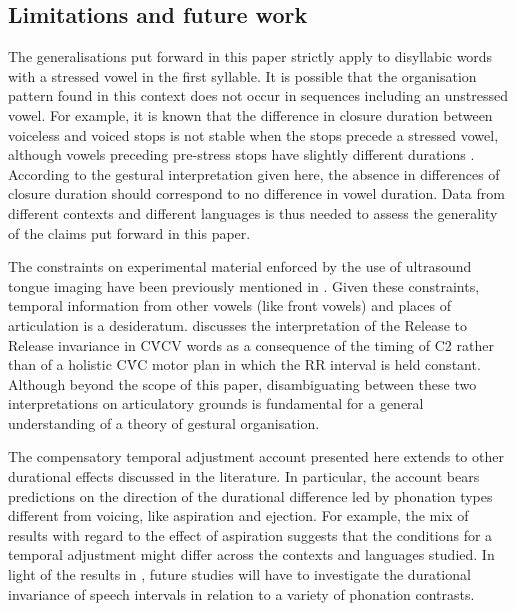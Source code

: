 \documentclass[preprint]{JASAnew}
\begin{document}
\hypertarget{limitations-and-future-work}{%
\subsection{Limitations and future
work}\label{limitations-and-future-work}}

The generalisations put forward in this paper strictly apply to
disyllabic words with a stressed vowel in the first syllable. It is
possible that the organisation pattern found in this context does not
occur in sequences including an unstressed vowel. For example, it is
known that the difference in closure duration between voiceless and
voiced stops is not stable when the stops precede a stressed vowel,
although vowels preceding pre-stress stops have slightly different
durations \citep{davis1989}. According to the gestural interpretation
given here, the absence in differences of closure duration should
correspond to no difference in vowel duration. Data from different
contexts and different languages is thus needed to assess the generality
of the claims put forward in this paper.

The constraints on experimental material enforced by the use of
ultrasound tongue imaging have been previously mentioned in
. Given these constraints, temporal information from
other vowels (like front vowels) and places of articulation is a
desideratum.  discusses the interpretation of the
Release to Release invariance in CV́CV words as a consequence of the
timing of C2 rather than of a holistic CV́C motor plan in which the RR
interval is held constant. Although beyond the scope of this paper,
disambiguating between these two interpretations on articulatory grounds
is fundamental for a general understanding of a theory of gestural
organisation.

The compensatory temporal adjustment account presented here extends to
other durational effects discussed in the literature. In particular, the
account bears predictions on the direction of the durational difference
led by phonation types different from voicing, like aspiration and
ejection. For example, the mix of results with regard to the effect of
aspiration \citep{durvasula2012} suggests that the conditions for a
temporal adjustment might differ across the contexts and languages
studied. In light of the results in \citet{begus2017}, future studies
will have to investigate the durational invariance of speech intervals
in relation to a variety of phonation contrasts.
\end{document}
